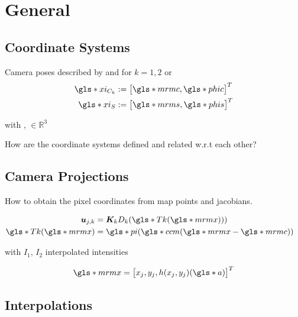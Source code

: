 \section{General}

\subsection{Coordinate Systems}
  
Camera poses described by  and  for $k = 1, 2$ or 
  \begin{align*}
    \g{xi}_{C_k} &:= \begin{bmatrix} \g{mrmc}, \g{phic} \end{bmatrix}^T \\
    \g{xi}_S &:= \begin{bmatrix} \g{mrms}, \g{phis} \end{bmatrix}^T
  \end{align*}
  
with ,  $\in\mathbb{R}^3$ \cite{Primer}

How are the coordinate systems defined and related w.r.t each other?

\subsection{Camera Projections}

How to obtain the pixel coordinates from map points and jacobians.
      
    \begin{align*}
      \vc u_{j,k} &= \vc K_k D_k(\g{Tk}(\g{mrmx}))) \\
      \g{Tk}(\g{mrmx}) &= \g{pi}(\g{ccm} (\g{mrmx} - \g{mrmc})) \hspace{1em} 
      \label{eq:pixel}
    \end{align*}

    with $I_1$, $I_2$ interpolated intensities 

    \begin{equation*}
      \g{mrmx} = \begin{bmatrix} x_j, y_j, h(x_j,y_j)(\g{a})\end{bmatrix} ^T
    \end{equation*}

\subsection{Interpolations}

